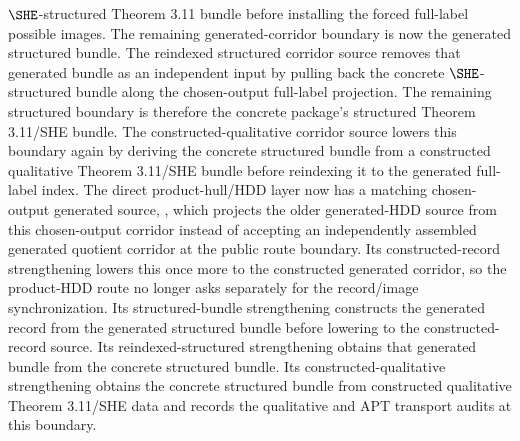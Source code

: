 \begin{definition}
  \(\SHE\)-structured Theorem 3.11 bundle before installing the forced
  full-label possible images.  The remaining generated-corridor boundary is now
  the generated structured bundle.  The reindexed structured corridor source
  removes that generated bundle as an independent input by pulling back the
  concrete \(\SHE\)-structured bundle along the chosen-output full-label
  projection.  The remaining structured boundary is therefore the concrete
  package's structured Theorem 3.11/SHE bundle.  The constructed-qualitative
  corridor source
  lowers this boundary again by deriving the concrete structured bundle from a
  constructed qualitative Theorem 3.11/SHE bundle before reindexing it to the
  generated full-label index.  The direct product-hull/HDD layer now has a
  matching chosen-output generated source,
  ,
  which projects the older generated-HDD source from this chosen-output
  corridor instead of accepting an independently assembled generated quotient
  corridor at the public route boundary.  Its constructed-record strengthening
  lowers this once more to the constructed generated corridor, so the
  product-HDD route no longer asks separately for the record/image
  synchronization.  Its structured-bundle strengthening
  constructs the generated record from the generated structured bundle before
  lowering to the constructed-record source.  Its reindexed-structured
  strengthening
  obtains that generated bundle from the concrete structured bundle.  Its
  constructed-qualitative strengthening
  obtains the concrete structured bundle from constructed qualitative
  Theorem 3.11/SHE data and records the qualitative and APT transport audits
  at this boundary.
\end{definition}

